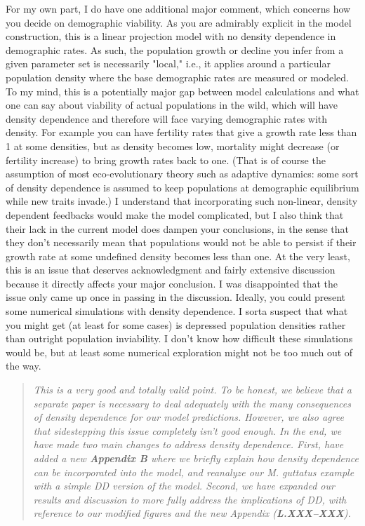\documentclass[11pt]{article}
\begin{document}
For my own part, I do have one additional major comment, which concerns how you decide on demographic viability. As you are admirably explicit in the model construction, this is a linear projection model with no density dependence in demographic rates. As such, the population growth or decline you infer from a given parameter set is necessarily "local," i.e., it applies around a particular population density where the base demographic rates are measured or modeled. To my mind, this is a potentially major gap between model calculations and what one can say about viability of actual populations in the wild, which will have density dependence and therefore will face varying demographic rates with density. For example you can have fertility rates that give a growth rate less than 1 at some densities, but as density becomes low, mortality might decrease (or fertility increase) to bring growth rates back to one. (That is of course the assumption of most eco-evolutionary theory such as adaptive dynamics: some sort of density dependence is assumed to keep populations at demographic equilibrium while new traits invade.) I understand that incorporating such non-linear, density dependent feedbacks would make the model complicated, but I also think that their lack in the current model does dampen your conclusions, in the sense that they don’t necessarily mean that populations would not be able to persist if their growth rate at some undefined density becomes less than one. At the very least, this is an issue that deserves acknowledgment and fairly extensive discussion because it directly affects your major conclusion. I was disappointed that the issue only came up once in passing in the discussion. Ideally, you could present some numerical simulations with density dependence. I sorta suspect that what you might get (at least for some cases) is depressed population densities rather than outright population inviability. I don’t know how difficult these simulations would be, but at least some numerical exploration might not be too much out of the way.

\begin{quote}
	{\itshape This is a very good and totally valid point. To be honest, we believe that a separate paper is necessary to deal adequately with the many consequences of density dependence for our model predictions. However, we also agree that sidestepping this issue completely isn't good enough. In the end, we have made two main changes to address density dependence. First, have added a new {\bf Appendix B} where we briefly explain how density dependence can be incorporated into the model, and reanalyze our {\itshape M. guttatus} example with a simple DD version of the model. Second, we have expanded our results and discussion to more fully address the implications of DD, with reference to our modified figures and the new Appendix ({\bf L.XXX--XXX}).}
\end{quote}
\end{document}
